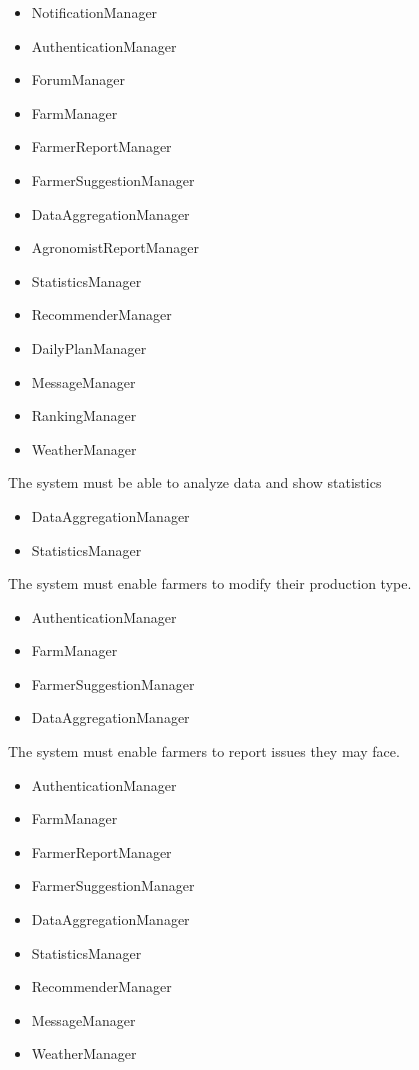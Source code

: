 \begin{itemize}
\begin{itemize}
\item NotificationManager
\item AuthenticationManager
\item ForumManager
\item FarmManager
\item FarmerReportManager
\item FarmerSuggestionManager
\item DataAggregationManager
\item AgronomistReportManager
\item StatisticsManager
\item RecommenderManager
\item DailyPlanManager
\item MessageManager
\item RankingManager
\item WeatherManager

\end{itemize}
 The system must be able to analyze data and show statistics
\begin{itemize}


\item DataAggregationManager
\item StatisticsManager

\end{itemize}
 The system must enable farmers to modify their production type.
\begin{itemize}


\item AuthenticationManager
\item FarmManager
\item FarmerSuggestionManager
\item DataAggregationManager

\end{itemize}


 The system must enable farmers to report issues they may face.
\begin{itemize}

\item AuthenticationManager
\item FarmManager
\item FarmerReportManager
\item FarmerSuggestionManager
\item DataAggregationManager
\item StatisticsManager
\item RecommenderManager
\item MessageManager
\item WeatherManager


\end{itemize}
\end{itemize}
